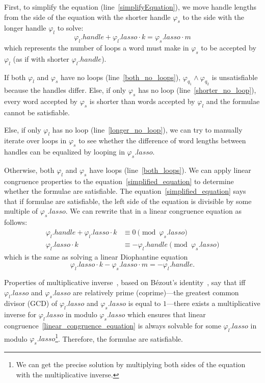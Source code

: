 First, to simplify the equation (line~\ref{simplifyEquation}), we move handle lengths from the side of the equation with the shorter handle $\varphi_s$ to the side with the longer handle $\varphi_l$ to solve:
\begin{equation}\label{simplified_equation}
    \varphi_{l}.handle + \varphi_{l}.lasso \cdot k = \varphi_{s}.lasso \cdot m
\end{equation}
which represents the number of loops a word must make in $\varphi_{s}$ to be accepted by $\varphi_l$ (as if with shorter $\varphi_l.handle$).

If both $\varphi_l$ and $\varphi_s$ have no loops (line~\ref{both_no_loops}), $\varphi_{q_1} \land \varphi_{q_2}$ is unsatisfiable because the handles differ. Else, if only $\varphi_s$ has no loop (line~\ref{shorter_no_loop}), every word accepted by $\varphi_s$ is shorter than words accepted by $\varphi_l$ and the formulae cannot be satisfiable.

Else, if only $\varphi_l$ has no loop (line~\ref{longer_no_loop}), we can try to manually iterate over loops in $\varphi_s$ to see whether the difference of word lengths between handles can be equalized by looping in $\varphi_s.lasso$.

Otherwise, both $\varphi_l$ and $\varphi_s$ have loops (line~\ref{both_loops}). We can apply linear congruence properties to the equation~\ref{simplified_equation} to determine whether the formulae are satisfiable. The equation~\ref{simplified_equation} says that if formulae are satisfiable, the left side of the equation is divisible by some multiple of $\varphi_s.lasso$. We can rewrite that in a linear congruence equation as follows:
\begin{align}
    \varphi_{l}.handle + \varphi_{l}.lasso \cdot k &\equiv 0 \pmod{\varphi_s.lasso} \\
    \varphi_{l}.lasso \cdot k &\equiv - \varphi_{l}.handle  \pmod{\varphi_s.lasso} \label{linear_congruence_equation}
\end{align}
which is the same as solving a linear Diophantine equation
\begin{equation}
    \varphi_{l}.lasso \cdot k - \varphi_s.lasso \cdot m = - \varphi_{l}.handle \text{.} \label{linear_diophantine_equation}
\end{equation}

Properties of multiplicative inverse~\cite{DivisibilityAndGreatestCommonDiviser, LinearCongruences}, based on Bézout's identity~\cite{DivisibilityAndGreatestCommonDiviser}, say that iff $\varphi_l.lasso$ and $\varphi_s.lasso$ are relatively prime (coprime)---the greatest common divisor (GCD) of $\varphi_l.lasso$ and $\varphi_s.lasso$ is equal to $1$---there exists a multiplicative inverse for $\varphi_l.lasso$ in modulo $\varphi_s.lasso$ which ensures that linear congruence~\ref{linear_congruence_equation} is always solvable for some $\varphi_l.lasso$ in modulo $\varphi_s.lasso$\footnote{We can get the precise solution by multiplying both sides of the equation with the multiplicative inverse.}. Therefore, the formulae are satisfiable.

